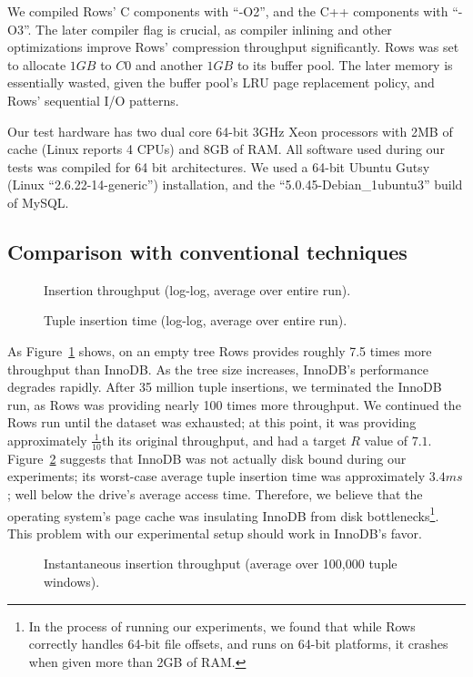 \documentclass{sig-alternate-sigmod08}
\newcommand{\rows}{Rows\xspace}
\newcommand{\rowss}{Rows'\xspace}
\begin{document}
We compiled \rowss C components with ``-O2'', and the C++ components
with ``-O3''.  The later compiler flag is crucial, as compiler
inlining and other optimizations improve \rowss compression throughput
significantly.  \rows was set to allocate $1GB$ to $C0$ and another
$1GB$ to its buffer pool.  The later memory is essentially wasted,
given the buffer pool's LRU page replacement policy, and \rowss
sequential I/O patterns.

Our test hardware has two dual core 64-bit 3GHz Xeon processors with
2MB of cache (Linux reports 4 CPUs) and 8GB of RAM.  All software used during our tests
was compiled for 64 bit architectures.  We used a 64-bit Ubuntu Gutsy
(Linux ``2.6.22-14-generic'') installation, and the
``5.0.45-Debian\_1ubuntu3'' build of MySQL.

\subsection{Comparison with conventional techniques}

\begin{figure}
\centering {}
\caption{Insertion throughput (log-log, average over entire run).}
\label{fig:avg-thru}
\end{figure}
\begin{figure}
\centering
{}
\caption{Tuple insertion time (log-log, average over entire run).}
\label{fig:avg-tup}
\end{figure}

As Figure~\ref{fig:avg-thru} shows, on an empty tree \rows provides
roughly 7.5 times more throughput than InnoDB.  As the tree size
increases, InnoDB's performance degrades rapidly.  After 35 million
tuple insertions, we terminated the InnoDB run, as \rows was providing
nearly 100 times more throughput.  We continued the \rows run until
the dataset was exhausted; at this point, it was providing
approximately $\frac{1}{10}$th its original throughput, and had a
target $R$ value of $7.1$.  Figure~\ref{fig:avg-tup} suggests that
InnoDB was not actually disk bound during our experiments; its
worst-case average tuple insertion time was approximately $3.4 ms$;
well below the drive's average access time.  Therefore, we believe
that the operating system's page cache was insulating InnoDB from disk
bottlenecks\footnote{In the process of running our experiments, we
  found that while \rows correctly handles 64-bit file offsets, and
  runs on 64-bit platforms, it crashes when given more than 2GB of
  RAM.}.  This problem with our experimental setup should work in InnoDB's favor.
\begin{figure}
\centering
{}
\caption{Instantaneous insertion throughput (average over 100,000 tuple windows).}
\label{fig:inst-thru}
\end{figure}
\end{document}
